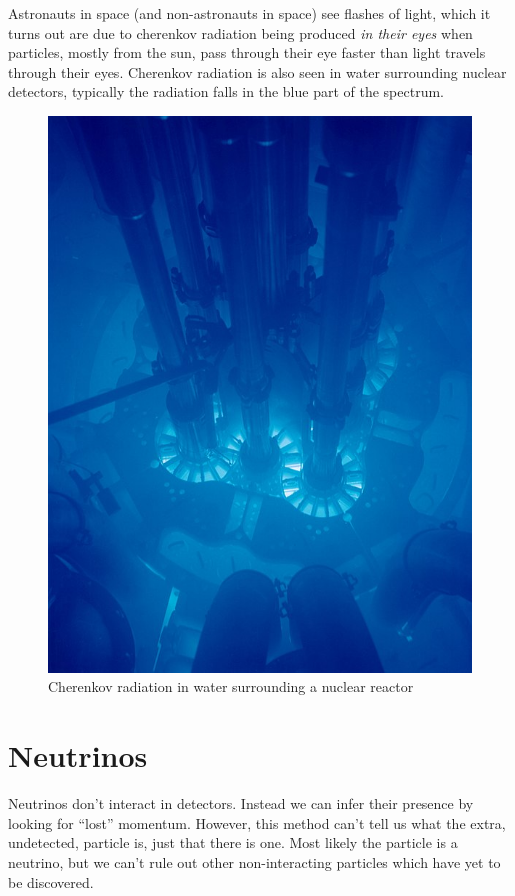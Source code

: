 \documentclass[fleqn]{NotesClass}
\begin{document}
    Astronauts in space (and non-astronauts in space) see flashes of light, which it turns out are due to cherenkov radiation being produced \emph{in their eyes} when particles, mostly from the sun, pass through their eye faster than light travels through their eyes.
    Cherenkov radiation is also seen in water surrounding nuclear detectors, typically the radiation falls in the blue part of the spectrum.
    
    \begin{figure}
        \includegraphics[width=\textwidth]{images/cherenkov-radiation.jpg}
        \caption{Cherenkov radiation in water surrounding a nuclear reactor \cite{cherenkovRadiation}}
    \end{figure}
    
    \section{Neutrinos}
    Neutrinos don't interact in detectors.
    Instead we can infer their presence by looking for \enquote{lost} momentum.
    However, this method can't tell us what the extra, undetected, particle is, just that there is one.
    Most likely the particle is a neutrino, but we can't rule out other non-interacting particles which have yet to be discovered.
    
\end{document}

